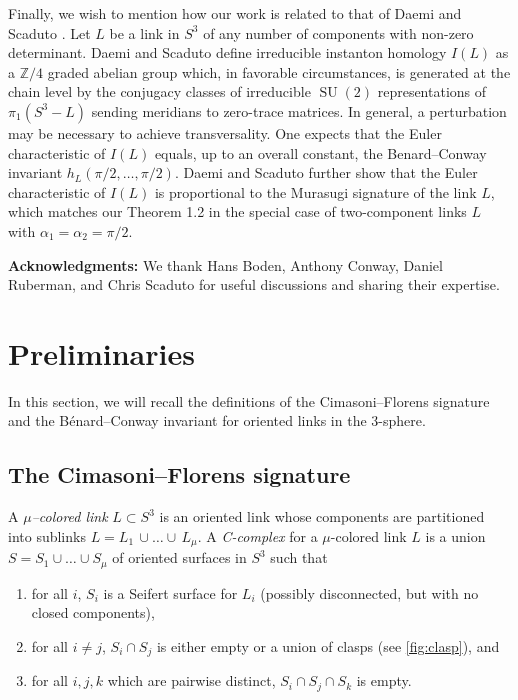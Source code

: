 \documentclass[11pt,reqno]{amsart}
\theoremstyle{definition}
\newcommand{\SU}{\operatorname{SU}}
\begin{document}
\begin{sloppypar}
Finally, we wish to mention how our work is related to that of Daemi and Scaduto \cite{Daemi-Scaduto-2}. Let $L$ be a link in $S^3$ of any number of components with non-zero determinant. Daemi and Scaduto  \cite{Daemi-Scaduto-2} define irreducible instanton homology $I(L)$ as a $\mathbb Z/4$ graded abelian group which, in favorable circumstances, is generated at the chain level by the conjugacy classes of irreducible $\SU(2)$ representations of $\pi_1 (S^3 - L)$ sending meridians to zero-trace matrices. In general, a perturbation may be necessary to achieve transversality. One expects that the Euler characteristic of $I(L)$ equals, up to an overall constant, the Benard--Conway invariant $h_L (\pi/2,\ldots,\pi/2)$. Daemi and Scaduto \cite{Daemi-Scaduto-2} further show that the Euler characteristic of $I(L)$ is proportional to the Murasugi signature of the link $L$, which matches our Theorem 1.2 in the special case of two-component links $L$ with $\alpha_1 = \alpha_2 = \pi/2$. 

\medskip\noindent
{\bf Acknowledgments:} We thank Hans Boden, Anthony Conway, Daniel Ruberman, and Chris Scaduto for useful discussions and sharing their expertise. 

	
\section{Preliminaries}\label{sec:two}
In this section, we will recall the definitions of the Cimasoni--Florens signature \cite{Cimasoni-Florens} and the B{\'e}nard--Conway invariant \cite{Benard-Conway} for oriented links in the 3-sphere.
		

\subsection{The Cimasoni--Florens signature}
A \textit{$\mu$--colored link} $L \subset S^3$ is an oriented link whose components are partitioned into sublinks $L = L_1\,\cup \ldots \cup\, L_{\mu}$. A \textit{C-complex} for a $\mu$-colored link $L$ is a union $S = S_1 \cup \dots \cup S_{\mu}$ of oriented surfaces in $S^3$ such that
\begin{enumerate}
\item for all $i$, $S_i$ is a Seifert surface for $L_i$ (possibly disconnected, but with no closed components),
\item for all $i \ne j$, $S_i \cap S_j$ is either empty or a union of clasps (see \autoref{fig:clasp}), and 
\item for all $i, j, k$ which are pairwise distinct, $S_i \cap S_j \cap S_k$ is empty.
\end{enumerate}


\end{sloppypar}
\end{document}
